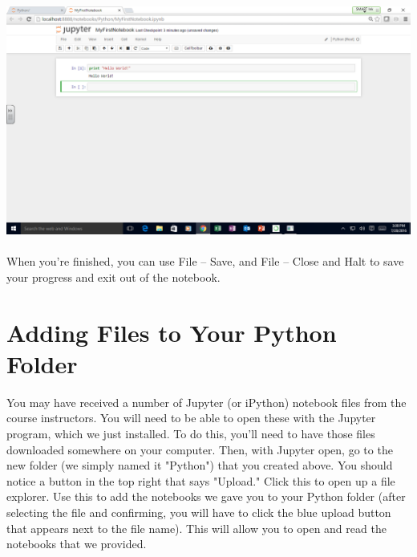 \documentclass[]{article}
\begin{document}
\paragraph{}
\begin{centering}
    \centerline{\includegraphics[scale=0.35]{Screenshot_24.png}}
\end{centering}

\paragraph{}
When you're finished, you can use File -- Save, and File -- Close and Halt to save your progress and exit out of the notebook.

\section*{Adding Files to Your Python Folder}
You may have received a number of Jupyter (or iPython) notebook files from the course instructors. You will need to be able to open these with the Jupyter program, which we just installed. To do this, you'll need to have those files downloaded somewhere on your computer. Then, with Jupyter open, go to the new folder (we simply named it "Python") that you created above. You should notice a button in the top right that says "Upload." Click this to open up a file explorer. Use this to add the notebooks we gave you to your Python folder (after selecting the file and confirming, you will have to click the blue upload button that appears next to the file name). This will allow you to open and read the notebooks that we provided.
\end{document}
